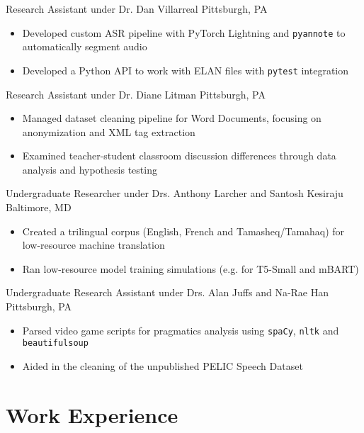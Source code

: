 \documentclass[11pt]{tianyicv}
\begin{document}
{Research Assistant under Dr. Dan Villarreal}
{Pittsburgh, PA}{}{
    \begin{itemize}
        \item Developed custom ASR pipeline with PyTorch Lightning and \texttt{pyannote} to automatically segment audio
        \item Developed a Python API to work with ELAN files with \texttt{pytest} integration
    \end{itemize}
}

{Research Assistant under Dr. Diane Litman}
{Pittsburgh, PA}{}{
    \begin{itemize}
        \item Managed dataset cleaning pipeline for Word Documents, focusing on anonymization and XML tag extraction
        \item Examined teacher-student classroom discussion differences through data analysis and hypothesis testing 
    \end{itemize}
}

{Undergraduate Researcher under Drs. Anthony Larcher and Santosh Kesiraju}
{Baltimore, MD}{}{
    \begin{itemize}
        \item Created a trilingual corpus (English, French and Tamasheq/Tamahaq) for low-resource machine translation
        \item Ran low-resource model training simulations (e.g. for T5-Small and mBART)
    \end{itemize}
}

{Undergraduate Research Assistant under Drs. Alan Juffs and Na-Rae Han}
{Pittsburgh, PA}{}{
    \begin{itemize}
        \item Parsed video game scripts for pragmatics analysis using \texttt{spaCy}, \texttt{nltk} and \texttt{beautifulsoup}
        \item Aided in the cleaning of the unpublished PELIC Speech Dataset
    \end{itemize}
}

\section{Work Experience}
\end{document}
